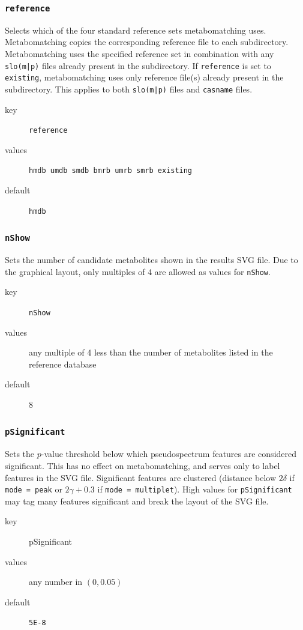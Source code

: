 \documentclass[a4paper,11pt]{article}
\begin{document}
\subsubsection{ \texttt{reference} \label{setting:reference}}
Selects which of the four standard reference sets metabomatching uses. Metabomatching copies the corresponding reference file to each subdirectory. Metabomatching uses the specified reference set in combination with any \verb+slo(m|p)+ files already present in the subdirectory. If \verb|reference| is set to \verb|existing|, metabomatching uses only reference file(s) already present in the subdirectory. This applies to both \verb+slo(m|p)+ files and \verb|casname| files. 
\begin{description}
	\item[key] \texttt{reference}
	\item[values] \texttt{hmdb umdb smdb bmrb umrb smrb existing}
	\item[default] \texttt{hmdb}
\end{description}
\subsubsection{\texttt{nShow} \label{setting:nshow}}
Sets the number of candidate metabolites shown in the results SVG file. Due to the graphical layout, only multiples of 4 are allowed as values for \texttt{nShow}.
\begin{description}
	\item[key] \texttt{nShow}
	\item[values] any multiple of 4 less than the number of metabolites listed in the reference database
	\item[default] 8
\end{description}
\subsubsection{\texttt{pSignificant} \label{setting:psignificant}}
Sets the $p$-value threshold below which pseudospectrum features are considered significant. This has no effect on metabomatching, and serves only to label features in the SVG file. Significant features are clustered (distance below $2\delta$ if \texttt{mode = peak} or $2\gamma+0.3$ if \texttt{mode = multiplet}). High values for \texttt{pSignificant} may tag many features significant and break the layout of the SVG file.
\begin{description}
	\item[key] pSignificant
	\item[values] any number in $(0,0.05)$
	\item[default] \texttt{5E-8}
\end{description}
\end{document}
